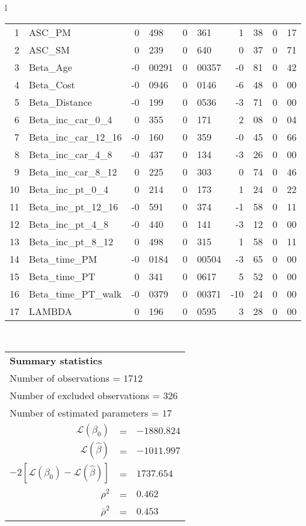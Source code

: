 \begin{tabular}{l}
\begin{tabular}{rlr@{.}lr@{.}lr@{.}lr@{.}l}
1 & ASC_PM  & 0&498 & 0&361 & 1&38 & 0&17\\
2 & ASC_SM & 0&239 & 0&640 & 0&37 & 0&71\\
3 & Beta_Age & -0&00291 & 0&00357 & -0&81 & 0&42\\
4 & Beta_Cost & -0&0946 & 0&0146 & -6&48 & 0&00\\
5 & Beta_Distance & -0&199 & 0&0536 & -3&71 & 0&00\\
6 & Beta_inc_car_0_4 & 0&355 & 0&171 & 2&08 & 0&04\\
7 & Beta_inc_car_12_16 & -0&160 & 0&359 & -0&45 & 0&66\\
8 & Beta_inc_car_4_8 & -0&437 & 0&134 & -3&26 & 0&00\\
9 & Beta_inc_car_8_12 & 0&225 & 0&303 & 0&74 & 0&46\\
10 & Beta_inc_pt_0_4 & 0&214 & 0&173 & 1&24 & 0&22\\
11 & Beta_inc_pt_12_16 & -0&591 & 0&374 & -1&58 & 0&11\\
12 & Beta_inc_pt_4_8 & -0&440 & 0&141 & -3&12 & 0&00\\
13 & Beta_inc_pt_8_12 & 0&498 & 0&315 & 1&58 & 0&11\\
14 & Beta_time_PM & -0&0184 & 0&00504 & -3&65 & 0&00\\
15 & Beta_time_PT & 0&341 & 0&0617 & 5&52 & 0&00\\
16 & Beta_time_PT_walk & -0&0379 & 0&00371 & -10&24 & 0&00\\
17 & LAMBDA & 0&196 & 0&0595 & 3&28 & 0&00\\
\hline
\end{tabular}
\\
\begin{tabular}{rcl}
\multicolumn{3}{l}{\bf Summary statistics}\\
\multicolumn{3}{l}{ Number of observations = $1712$} \\
\multicolumn{3}{l}{ Number of excluded observations = $326$} \\
\multicolumn{3}{l}{ Number of estimated  parameters = $17$} \\
 $\mathcal{L}(\beta_0)$ &=&  $-1880.824$ \\
 $\mathcal{L}(\hat{\beta})$ &=& $-1011.997 $  \\
 $-2[\mathcal{L}(\beta_0) -\mathcal{L}(\hat{\beta})]$ &=& $1737.654$ \\
    $\rho^2$ &=&   $0.462$ \\
    $\bar{\rho}^2$ &=&    $0.453$ \\
\end{tabular}
  \end{tabular}
